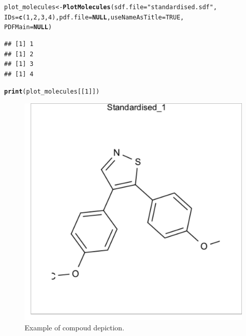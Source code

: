 \documentclass[twoside,a4wide,12pt]{article}\usepackage[]{graphicx}\usepackage[]{color}
\makeatletter
\def\maxwidth{ %
  \ifdim\Gin@nat@width>\linewidth
    \linewidth
  \else
    \Gin@nat@width
  \fi
}
\newcommand{\hlnum}[1]{\textcolor[rgb]{0.686,0.059,0.569}{#1}}%
\newcommand{\hlstr}[1]{\textcolor[rgb]{0.192,0.494,0.8}{#1}}%
\newcommand{\hlstd}[1]{\textcolor[rgb]{0.345,0.345,0.345}{#1}}%
\newcommand{\hlkwa}[1]{\textcolor[rgb]{0.161,0.373,0.58}{\textbf{#1}}}%
\newcommand{\hlkwb}[1]{\textcolor[rgb]{0.69,0.353,0.396}{#1}}%
\newcommand{\hlkwc}[1]{\textcolor[rgb]{0.333,0.667,0.333}{#1}}%
\newcommand{\hlkwd}[1]{\textcolor[rgb]{0.737,0.353,0.396}{\textbf{#1}}}%
\newenvironment{kframe}{%
 \def\at@end@of@kframe{}%
 \ifinner\ifhmode%
  \def\at@end@of@kframe{\end{minipage}}%
  \begin{minipage}{\columnwidth}%
 \fi\fi%
 \def\FrameCommand##1{\hskip\@totalleftmargin \hskip-\fboxsep
 \colorbox{shadecolor}{##1}\hskip-\fboxsep
     \hskip-\linewidth \hskip-\@totalleftmargin \hskip\columnwidth}%
 \MakeFramed {\advance\hsize-\width
   \@totalleftmargin\z@ \linewidth\hsize
   \@setminipage}}%
 {\par\unskip\endMakeFramed%
 \at@end@of@kframe}
\newenvironment{knitrout}{}{} %
\makeatother
\begin{document}
\begin{knitrout}
\color{fgcolor}\begin{kframe}
\begin{alltt}
\hlstd{plot_molecules} \hlkwb{<-} \hlkwd{PlotMolecules}\hlstd{(}\hlkwc{sdf.file} \hlstd{=} \hlstr{"standardised.sdf"}\hlstd{,}
    \hlkwc{IDs} \hlstd{=} \hlkwd{c}\hlstd{(}\hlnum{1}\hlstd{,} \hlnum{2}\hlstd{,} \hlnum{3}\hlstd{,} \hlnum{4}\hlstd{),} \hlkwc{pdf.file} \hlstd{=} \hlkwa{NULL}\hlstd{,} \hlkwc{useNameAsTitle} \hlstd{=} \hlnum{TRUE}\hlstd{,}
    \hlkwc{PDFMain} \hlstd{=} \hlkwa{NULL}\hlstd{)}
\end{alltt}
\begin{verbatim}
## [1] 1
## [1] 2
## [1] 3
## [1] 4
\end{verbatim}
\begin{alltt}
\hlkwd{print}\hlstd{(plot_molecules[[}\hlnum{1}\hlstd{]])}
\end{alltt}
\end{kframe}\begin{figure}

{\centering \includegraphics[width=\maxwidth]{figure/unnamed-chunk-20-1} 

}

\caption[Example of compoud depiction]{Example of compoud depiction.}\label{fig:unnamed-chunk-20}
\end{figure}


\end{knitrout}
\end{document}

